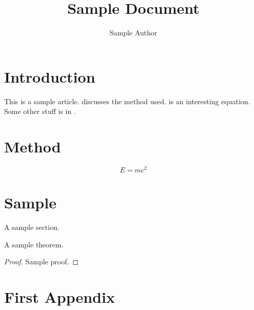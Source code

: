 \documentclass{article}
\title{Sample Document}
\author{Sample Author}
\begin{document}
\maketitle

\begin{abstract}
\lipsum[1]
\end{abstract}

\section{Introduction}

This is a sample article.  discusses
the method used.  is an interesting
equation. Some other stuff is in .

\lipsum

\section{Method}\label{sec:method}

\lipsum

\begin{equation}\label{eq:emc2}
E = mc^{2}
\end{equation}

\lipsum


\section{Sample}
A sample section.

\begin{theorem}
A sample theorem.
\begin{proof}
Sample proof.
\end{proof}
\end{theorem}

\appendix
\section{First Appendix}\label{apd:first}

\lipsum
\end{document}
